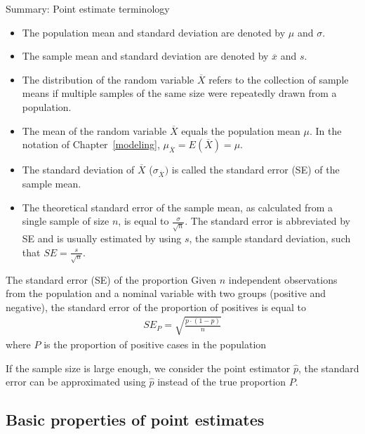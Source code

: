 \begin{onebox}{Summary: Point estimate terminology}
\begin{itemize}
	\setlength{\itemsep}{0mm}
	\item The population mean and standard deviation are denoted by $\mu$ and $\sigma$.
	\item The sample mean and standard deviation are denoted by $\overline{x}$ and $s$.
	\item The distribution of the random variable $\overline{X}$ refers to the collection of sample means if multiple samples of the same size were repeatedly drawn from a population.
	\item The mean of the random variable $\overline{X}$ equals the population mean $\mu$. In the notation of Chapter~\ref{modeling}, $\mu_{\overline{X}} = E(\overline{X}) = \mu$.
	\item  The standard deviation of $\overline{X}$ ($\sigma_{\overline{X}})$ is called the standard error (SE) of the sample mean.
	\item The theoretical standard error of the sample mean, as calculated from a single sample of size $n$, is equal to $\frac{\sigma}{\sqrt{n}}$. The standard error is abbreviated by SE and is usually estimated by using $s$, the sample standard deviation, such that $SE = \frac{s}{\sqrt{n}}$.
\end{itemize}
\end{onebox}


\begin{onebox}{The standard error (SE) of the proportion}
Given $n$ independent observations from the   population and a nominal variable with two groups (positive and negative), the standard error of the proportion of positives is equal to \vspace{-1mm}
\begin{eqnarray}
SE_P = \sqrt{\frac{p\cdot(1-p)}{n}}
\label{seOfp}
\end{eqnarray}
where $P$ is the proportion of positive cases in the population%


\end{onebox}


If the sample size is large enough, we consider the point estimator $\hat{p}$, the standard error can be approximated using $\hat{p}$ instead of the true proportion $P$.
   
\subsection{Basic properties of point estimates}



